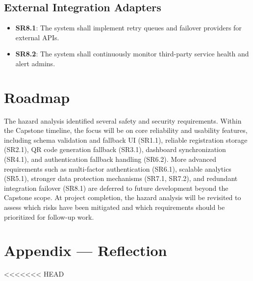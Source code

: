 \documentclass[12pt]{article}
\begin{document}
\subsection{External Integration Adapters}
\begin{itemize}
    \item \textbf{SR8.1}: The system shall implement retry queues and failover providers for external APIs.
    \item \textbf{SR8.2}: The system shall continuously monitor third-party service health and alert admins.
\end{itemize}


\section{Roadmap}

The hazard analysis identified several safety and security requirements. Within the Capstone timeline, the focus will be on core reliability and usability features, including schema validation and fallback UI (SR1.1), reliable registration storage (SR2.1), QR code generation fallback (SR3.1), dashboard synchronization (SR4.1), and authentication fallback handling (SR6.2). More advanced requirements such as multi-factor authentication (SR6.1), scalable analytics (SR5.1), stronger data protection mechanisms (SR7.1, SR7.2), and redundant integration failover (SR8.1) are deferred to future development beyond the Capstone scope. At project completion, the hazard analysis will be revisited to assess which risks have been mitigated and which requirements should be prioritized for follow-up work.


\newpage{}

\section*{Appendix --- Reflection}
<<<<<<< HEAD
% 
\end{document}
